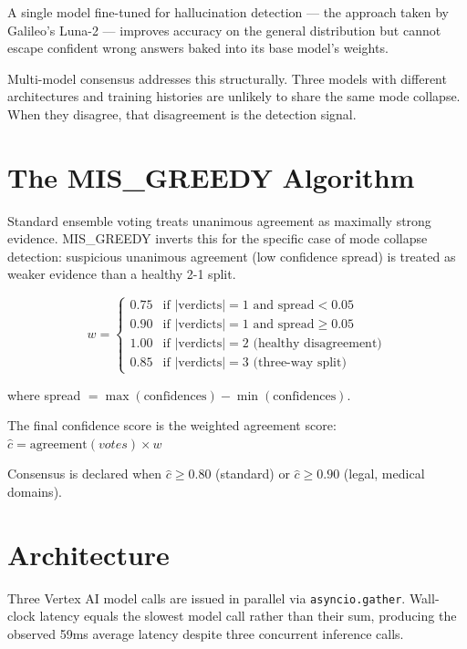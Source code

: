 \documentclass[11pt]{article}
\begin{document}
A single model fine-tuned for hallucination detection --- the approach
taken by Galileo's Luna-2 \cite{galileo2026luna2} --- improves accuracy
on the general distribution but cannot escape confident wrong answers
baked into its base model's weights.

Multi-model consensus addresses this structurally. Three models with
different architectures and training histories are unlikely to share
the same mode collapse. When they disagree, that disagreement is
the detection signal.

\section{The MIS\_GREEDY Algorithm}

Standard ensemble voting treats unanimous agreement as maximally strong
evidence. MIS\_GREEDY inverts this for the specific case of mode collapse
detection: suspicious unanimous agreement (low confidence spread) is
treated as weaker evidence than a healthy 2-1 split.

\begin{equation}
w = \begin{cases}
0.75 & \text{if } |\text{verdicts}| = 1 \text{ and spread} < 0.05 \\
0.90 & \text{if } |\text{verdicts}| = 1 \text{ and spread} \geq 0.05 \\
1.00 & \text{if } |\text{verdicts}| = 2 \text{ (healthy disagreement)} \\
0.85 & \text{if } |\text{verdicts}| = 3 \text{ (three-way split)}
\end{cases}
\end{equation}

where spread $= \max(\text{confidences}) - \min(\text{confidences})$.

The final confidence score is the weighted agreement score:
$\hat{c} = \text{agreement}(votes) \times w$

Consensus is declared when $\hat{c} \geq 0.80$ (standard) or
$\hat{c} \geq 0.90$ (legal, medical domains).

\section{Architecture}

Three Vertex AI model calls are issued in parallel via
\texttt{asyncio.gather}. Wall-clock latency equals the slowest
model call rather than their sum, producing the observed 59ms
average latency despite three concurrent inference calls.
\end{document}
